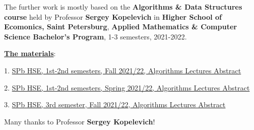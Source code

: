 
The further work is mostly based on the \textbf{Algorithms \& Data Structures course} held by Professor \textbf{Sergey Kopelevich} in \textbf{Higher School of Ecomonics, Saint Petersburg}, \textbf{Applied Mathematics \& Computer Science Bachelor's Program}, 1-3 semesters, 2021-2022.

\underline{\textbf{The materials}}:

1. \href{https://acm.math.spbu.ru/~sk1/courses/2122f_au/conspect/conspect.pdf}{SPb HSE, 1st-2nd semesters, Fall 2021/22, Algorithms Lectures Abstract}

2. \href{https://acm.math.spbu.ru/~sk1/courses/2122s_au/conspect/conspect.pdf}{SPb HSE, 1st-2nd semesters, Spring 2021/22, Algorithms Lectures Abstract}

3. \href{https://acm.math.spbu.ru/~sk1/courses/2122f_au2/conspect/conspect.pdf}{SPb HSE, 3rd semester, Fall 2021/22, Algorithms Lectures Abstract}

Many thanks to Professor \textbf{Sergey Kopelevich}!
